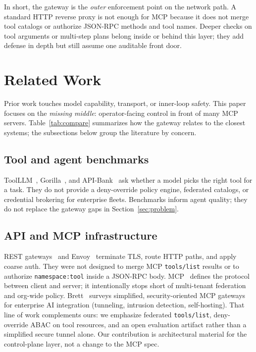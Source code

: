 \documentclass[11pt]{article}
\newcommand{\code}[1]{\texttt{#1}}
\begin{document}
In short, the gateway is the \emph{outer} enforcement point on the network path.
A standard HTTP reverse proxy is not enough for MCP because it does not merge tool catalogs or authorize JSON-RPC methods and tool names.
Deeper checks on tool arguments or multi-step plans belong inside or behind this layer; they add defense in depth but still assume one auditable front door.

\section{Related Work}
\label{sec:related}

Prior work touches model capability, transport, or inner-loop safety.
This paper focuses on the \emph{missing middle}: operator-facing control in front of many MCP servers.
Table~\ref{tab:compare} summarizes how the gateway relates to the closest systems; the subsections below group the literature by concern.

\subsection{Tool and agent benchmarks}

ToolLLM~\cite{qin2023toolllm}, Gorilla~\cite{patil2023gorilla}, and API-Bank~\cite{li2023apibank} ask whether a model picks the right tool for a task.
They do not provide a deny-override policy engine, federated catalogs, or credential brokering for enterprise fleets.
Benchmarks inform agent quality; they do not replace the gateway gaps in Section~\ref{sec:problem}.

\subsection{API and MCP infrastructure}

REST gateways~\cite{richardson2007rest} and Envoy~\cite{howard2019envoy} terminate TLS, route HTTP paths, and apply coarse auth.
They were not designed to merge MCP \code{tools/list} results or to authorize \code{namespace:tool} inside a JSON-RPC body.
MCP~\cite{anthropic2024mcp} defines the protocol between client and server; it intentionally stops short of multi-tenant federation and org-wide policy.
Brett~\cite{brett2025mcpgateway} surveys simplified, security-oriented MCP gateways for enterprise AI integration (tunneling, intrusion detection, self-hosting).
That line of work complements ours: we emphasize federated \code{tools/list}, deny-override ABAC on tool resources, and an open evaluation artifact rather than a simplified secure tunnel alone.
Our contribution is architectural material for the control-plane layer, not a change to the MCP spec.
\end{document}
